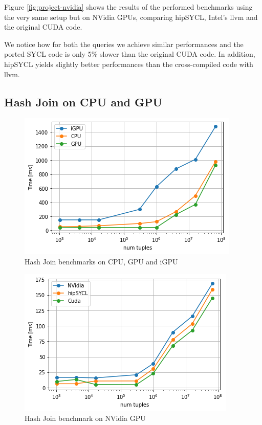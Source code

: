 \documentclass[sigconf, nonacm]{acmart}
\begin{document}
Figure \ref{fig:project-nvidia} shows the results of the performed benchmarks using the very same setup but on NVidia GPUs, comparing hipSYCL, Intel's llvm and the original CUDA code.

We notice how for both the queries we achieve similar performances and the ported SYCL code is only 5\% slower than the original CUDA code. In addition, hipSYCL yields slightly better performances than the cross-compiled code with llvm.

\subsection{Hash Join on CPU and GPU}

\begin{figure}[H]
  \centering
  \includegraphics[width=\linewidth]{figures/bench-gpu-cpu.png}
  \caption{Hash Join benchmarks on CPU, GPU and iGPU}
    \label{fig:join-intel}
\end{figure}

\begin{figure}[H]
  \centering
  \includegraphics[width=\linewidth]{figures/bench-hip-nvidia-cuda.png}
  \caption{Hash Join benchmark on NVidia GPU}
    \label{fig:join-nvidia}
\end{figure}
\end{document}
